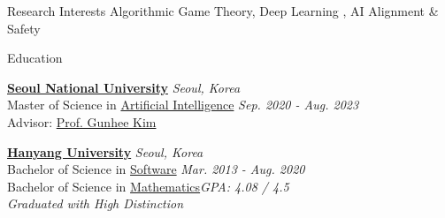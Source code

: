 \documentclass{resume} %
\begin{document}
	
	

\begin{rSection}{Research Interests}
	Algorithmic Game Theory, Deep Learning , AI Alignment \& Safety
\end{rSection}
	


\begin{rSection}{Education}

{\bf \href{https://www.snu.ac.kr/index.html}{Seoul National University}} \hfill{\em Seoul, Korea} \\
Master of Science in \href{https://gsai.snu.ac.kr/}{Artificial Intelligence} \hfill {\em Sep. 2020 - Aug. 2023} \\ 
Advisor: \href{https://vision.snu.ac.kr/gunhee/}{Prof. Gunhee Kim}


{\bf \href{https://www.hanyang.ac.kr/}{Hanyang University}} \hfill{\em Seoul, Korea} \\
Bachelor of Science in \href{http://cs.hanyang.ac.kr/}{Software} \hfill {\em Mar. 2013 - Aug. 2020} \\ 
Bachelor of Science in \href{http://math.hanyang.ac.kr}{Mathematics}\hfill{\em GPA: 4.08 / 4.5} \\
\textit{Graduated with High Distinction}
\end{rSection}

\end{document}

